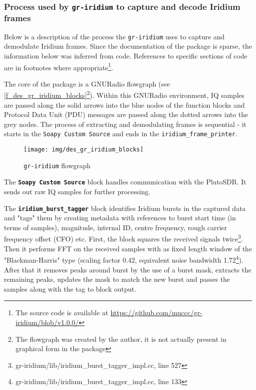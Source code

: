 \subsubsection{Process used by \texttt{gr-iridium} to capture and decode Iridium frames}
Below is a description of the process the \texttt{gr-iridium} uses to capture and demodulate Iridium frames. Since the documentation of the package is sparse, the information below was inferred from code. References to specific sections of code are in footnotes where appropriate\footnote{The source code is available at \url{https://github.com/muccc/gr-iridium/blob/v1.0.0/}}.

The core of the package is a GNURadio flowgraph (see \autoref{f_des_gr_iridium_blocks}\footnote{The flowgraph was created by the author, it is not actually present in graphical form in the package}). Within this GNURadio environment, IQ samples are passed along the solid arrows into the blue nodes of the function blocks and Protocol Data Unit (PDU) messages are passed along the dotted arrows into the grey nodes. The process of extracting and demodulating frames is sequential - it starts in the \texttt{Soapy Custom Source} and ends in the \texttt{iridium\_frame\_printer}.

\newcommand{\grline}[2]{\footnote{gr-iridium/lib/#1\_impl.cc, line #2}}
\newcommand{\grlinetagger}[1]{\grline{iridium\_burst\_tagger}{#1}}
\newcommand{\grlinedownmix}[1]{\grline{burst\_downmix}{#1}}
\newcommand{\grlinedemod}[1]{\grline{iridium\_qpsk\_demod}{#1}}

\begin{figure}
    \centering
    \texttt{[image: img/des\_gr\_iridium\_blocks]}
    \caption{\texttt{gr-iridium} flowgraph}
    \label{f_des_gr_iridium_blocks}
\end{figure}

The \textbf{\texttt{Soapy Custom Source}} block handles communication with the PlutoSDR. It sends out raw IQ samples for further processing.

The \textbf{\texttt{iridium\_burst\_tagger}} block identifies Iridium bursts in the captured data and "tags" them by creating metadata with references to burst start time (in terms of samples), magnitude, internal ID, centre frequency, rough carrier frequency offset (CFO) etc. First, the block squares the received signals twice\grlinetagger{527}. Then it performs FFT on the received samples with as fixed length window of the "Blackman-Harris" type (scaling factor \num{0.42}, equivalent noise bandwidth \num{1.72}\grlinetagger{133})\cite{des08}. After that it removes peaks around burst by the use of a burst mask, extracts the remaining peaks, updates the mask to match the new burst and passes the samples along with the tag to block output.


